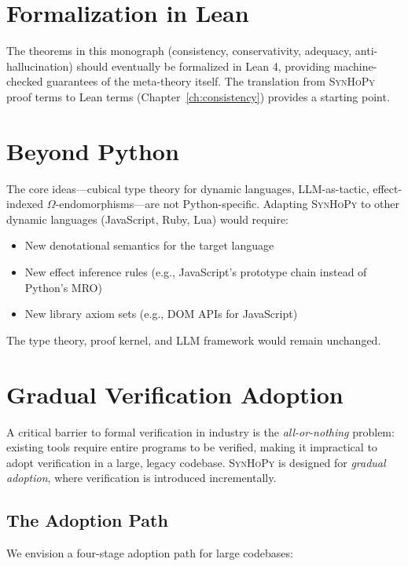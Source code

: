 \documentclass[11pt,a4paper]{report}
\theoremstyle{definition}
\theoremstyle{plain}
\newcommand{\synhopy}{\textsc{SynHoPy}}
\begin{document}
\section{Formalization in Lean}

The theorems in this monograph (consistency, conservativity, adequacy,
anti-hallucination) should eventually be formalized in Lean 4, providing
machine-checked guarantees of the meta-theory itself.  The translation from
\synhopy{} proof terms to Lean terms (Chapter~\ref{ch:consistency}) provides
a starting point.

\section{Beyond Python}

The core ideas---cubical type theory for dynamic languages, LLM-as-tactic,
effect-indexed $\Omega$-endomorphisms---are not Python-specific.  Adapting
\synhopy{} to other dynamic languages (JavaScript, Ruby, Lua) would require:
\begin{itemize}
  \item New denotational semantics for the target language
  \item New effect inference rules (e.g., JavaScript's prototype chain instead
    of Python's MRO)
  \item New library axiom sets (e.g., DOM APIs for JavaScript)
\end{itemize}
The type theory, proof kernel, and LLM framework would remain unchanged.

\section{Gradual Verification Adoption}
\label{sec:gradual-adoption}

A critical barrier to formal verification in industry is the \emph{all-or-nothing}
problem: existing tools require entire programs to be verified, making it
impractical to adopt verification in a large, legacy codebase.  \synhopy{}
is designed for \emph{gradual adoption}, where verification is introduced
incrementally.

\subsection{The Adoption Path}

We envision a four-stage adoption path for large codebases:
\end{document}
